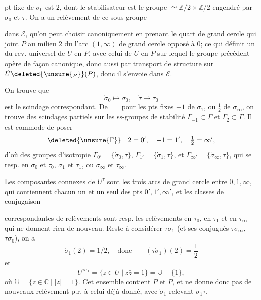   pt fixe de $\sigma_0$ est $2$, dont le stabilisateur est le groupe $\simeq\mathbb Z/2\times\mathbb Z/2$ engendré par $\sigma_0$ et $\tau$. On a un relèvement de ce sous-groupe

dans $\mathcal E$, qu'on peut choisir canoniquement en prenant le quart de grand cercle qui joint $P$ au milieu $2$ du  l'arc $(1,\infty)$ de grand cercle opposé à $0$; ce qui définit un  du rev. universel de $U$ en $P$, avec celui de $U$ en $\bar P$ sur lequel le groupe précédent opère de façon canonique, donc aussi par transport de structure sur $\tilde U\deleted{\unsure{_P}}(P)$, donc il s'envoie dans $\mathcal E$.

On trouve que
\[
\dot\sigma_0\mapsto\sigma_0,\quad\dot\tau\to\tau_0
\]
est le scindage correspondant. De $=$ pour les pts fixes $-1$ de $\dot\sigma_1$, ou $\frac12$ de $\dot\sigma_\infty$, on trouve des scindages partiels sur les ss-groupes de  stabilité $\Gamma_{-1}\subset\Gamma$ et $\Gamma_2\subset\Gamma$. Il est commode de poser
\[
\deleted{\unsure{\Gamma}}\quad 2=0',\quad -1=1',\quad \tfrac12=\infty',
\]
d'où des groupes d'isotropie $\Gamma_{0'}=\{\dot\sigma_0,\tau\}$, $\Gamma_{1'}=\{\dot\sigma_1,\tau\}$, et $\Gamma_{\infty'}=\{\dot\sigma_\infty,\tau\}$, qui se  resp. en $\sigma_0$ et $\tau_0$,  $\sigma_1$ et $\tau_1$, ou $\sigma_\infty$ et $\tau_\infty$.

Les composantes connexes de $U^\tau$ sont les trois arcs de grand cercle entre $0,1,\infty$, qui contiennent chacun un  et un seul des pts $0',1',\infty'$, et les classes de conjugaison

correspondantes de relèvements  sont resp. les relèvements en $\tau_0$, en $\tau_1$ et en $\tau_\infty$ --- qui ne donnent rien de nouveau. Reste à considérer $\tau\dot\sigma_1$ (et ses conjugués  $\tau\dot\sigma_\infty$, $\tau\dot\sigma_0$), on a
\[
\dot\sigma_1(2)=1/2,\quad\text{donc}\qquad(\tau\dot\sigma_1)(2)=\frac12
\]
et
\[
U^{\tau\dot\sigma_1}=\{z\in U\mid z\bar z=1\}=\mathbb U-\{1\},
\]
où $\mathbb U=\{z\in\mathbb C\mid|z|=1\}$. Cet ensemble contient $P$ et $\bar P$, et ne donne donc pas de nouveaux relèvement p.r. à celui déjà donné, avec $\tilde\sigma_1$ relevant $\dot\sigma_1\tau$.

